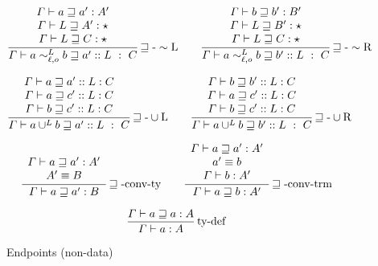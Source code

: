 \begin{figure}
\begin{align*}
  \frac{\begin{array}{c}
  \varGamma\vdash a\sqsupseteq a':A'\\
  \varGamma\vdash L\sqsupseteq A':\star\\
  \varGamma\vdash L\sqsupseteq C:\star
  \end{array}}{\varGamma\vdash a\sim_{\ell,o}^{L}b\sqsupseteq a'::L\ :\ C}\rulename{\sqsupseteq-\sim L}
  \quad & \quad 
  \frac{\begin{array}{c}
  \varGamma\vdash b\sqsupseteq b':B'\\
  \varGamma\vdash L\sqsupseteq B':\star\\
  \varGamma\vdash L\sqsupseteq C:\star
  \end{array}}{\varGamma\vdash a\sim_{\ell,o}^{L}b\sqsupseteq b'::L\ :\ C}\rulename{\sqsupseteq-\sim R}
\\
\end{align*}

\begin{align*}
  \frac{\begin{array}{c}
  \varGamma\vdash a\sqsupseteq a'::L:C\\
  \varGamma\vdash a\sqsupseteq c'::L:C\\
  \varGamma\vdash b\sqsupseteq c'::L:C
  \end{array}}{\varGamma\vdash a\cup^{L}b\sqsupseteq a'::L\ :\ C}\rulename{\sqsupseteq-\cup L}
  \quad & \quad 
  \frac{\begin{array}{c}
  \varGamma\vdash b\sqsupseteq b'::L:C\\
  \varGamma\vdash a\sqsupseteq c'::L:C\\
  \varGamma\vdash b\sqsupseteq c'::L:C
  \end{array}}{\varGamma\vdash a\cup^{L}b\sqsupseteq b'::L\ :\ C}\rulename{\sqsupseteq-\cup R}
\\
\end{align*}

\begin{align*}
  \frac{\begin{array}{c}
  \varGamma\vdash a\sqsupseteq a':A'\\
  A'\equiv B
  \end{array}}{\varGamma\vdash a\sqsupseteq a':B}\operatorname{\sqsupseteq-conv-ty}
  \quad & \quad 
  \frac{\begin{array}{c}
  \varGamma\vdash a\sqsupseteq a':A'\\
  a'\equiv b\\
  \varGamma\vdash b:A'
  \end{array}}{\varGamma\vdash a\sqsupseteq b:A'}\operatorname{\sqsupseteq-conv-trm}
\\
\end{align*}

\[
\frac{\varGamma\vdash a\sqsupseteq a:A}{\varGamma\vdash a:A}\operatorname{ty-def}
\]
\caption{Endpoints (non-data)}
\label{fig:cast-endpoint-rules}
\end{figure}
 
